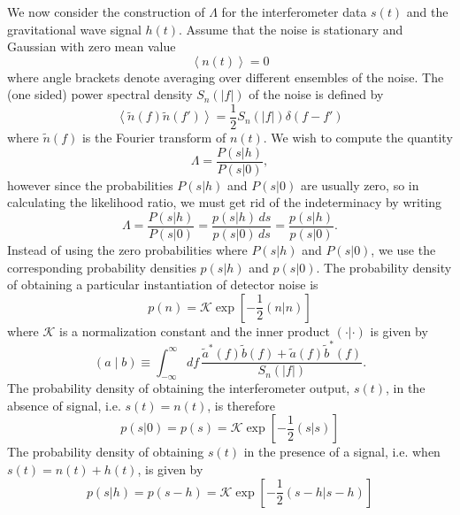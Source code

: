 We now consider the construction of $\Lambda$ for the interferometer data
$s(t)$ and the gravitational wave signal $h(t)$. Assume that the noise
is stationary and Gaussian with zero mean value
\begin{equation}
\left\langle n(t) \right\rangle = 0
\end{equation}
where angle brackets denote averaging over different ensembles of the
noise. The  (one sided) power spectral density $S_n(|f|)$ of the noise is
defined by
\begin{equation}
\left\langle \tilde{n}(f) \tilde{n}(f') \right\rangle = \frac{1}{2} S_n(|f|)
\delta(f-f')
\label{eq:ospsddef}
\end{equation}
where $\tilde{n}(f)$ is the Fourier transform of $n(t)$. We wish to compute
the quantity
\begin{equation}
\Lambda = \frac{P(s|h)}{P(s|0)},
\end{equation}
however since the probabilities $P(s|h)$ and $P(s|0)$ are usually zero, so in
calculating the likelihood ratio, we must get rid of the indeterminacy by
writing
\begin{equation}
\Lambda = \frac{P(s|h)}{P(s|0)}
= \frac{p(s|h)\,ds}{p(s|0)\,ds}
= \frac{p(s|h)}{p(s|0)}.
\end{equation}
Instead of using the zero probabilities where $P(s|h)$ and $P(s|0)$, we use the
corresponding probability densities $p(s|h)$ and $p(s|0)$. The probability
density of obtaining a particular instantiation of detector noise
is\cite{Finn:1992wt}
\begin{equation}
p(n) = \mathcal{K} \exp\left[-\frac{1}{2} (n|n)\right]
\end{equation}
where $\mathcal{K}$ is a normalization constant and the inner product
$(\cdot|\cdot)$ is given by
\begin{equation}
\label{eq:fullinnerproduct}
  (a\mid b) \equiv \int_{-\infty}^\infty df\,
  \frac{\tilde{a}^\ast(f)\tilde{b}(f)+\tilde{a}(f)\tilde{b}^\ast(f)}
       {S_n(|f|)}.
\end{equation}
The probability density of obtaining the interferometer output, $s(t)$, in the
absence of signal, i.e. $s(t) = n(t)$, is therefore
\begin{equation}
p(s|0) = p(s) = \mathcal{K} \exp\left[-\frac{1}{2} (s|s)\right]
\end{equation}
The probability density of obtaining $s(t)$ in the presence of a signal, i.e.
when $s(t) = n(t) + h(t)$, is given by 
\begin{equation}
p(s|h) = p(s-h) = \mathcal{K} \exp\left[-\frac{1}{2} (s-h|s-h)\right]
\end{equation}
